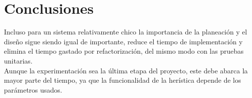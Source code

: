 \documentclass[a4paper]{article}
\begin{document}
%
\section*{Conclusiones}
Incluso para un sistema relativamente chico la importancia de la planeaci\'on y el diseño  sigue siendo igual de importante, reduce el tiempo de implementaci\'on y elimina el tiempo gastado por refactorizaci\'on, del mismo modo con las pruebas unitarias.   \\

Aunque la experimentaci\'on sea la \'ultima etapa del proyecto, este debe abarca la mayor parte del tiempo, ya que la funcionalidad de la her\'istica depende de los par\'ametros usados.

{}

\end{document}
